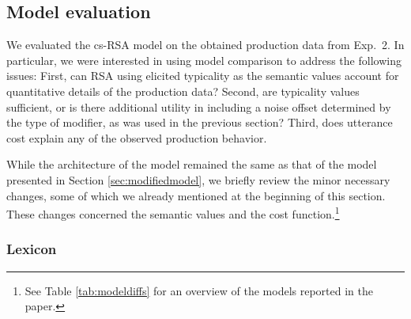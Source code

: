 \documentclass[11pt]{article}
\newcommand{\tableref}[1]{Table \ref{#1}}
\newcommand{\sectionref}[1]{Section \ref{#1}}
\begin{document}
\subsection{Model evaluation}
\label{sec:colorypicalitymodel}


We evaluated the cs-RSA model on the obtained production data from Exp.~2. In particular, we were interested in using model comparison to address the following issues:
First, can RSA using elicited typicality as the semantic values account for quantitative details of the production data?
Second, are typicality values sufficient, or is there additional utility in including a noise offset determined by the type of modifier, as was used in the previous section?
Third, does utterance cost explain any of the observed production behavior. 


While the architecture of the model remained the same as that of the model presented in \sectionref{sec:modifiedmodel}, we briefly review the minor necessary changes, some of which we already mentioned at the beginning of this section. These changes concerned the semantic values and the cost function.\footnote{See \tableref{tab:modeldiffs} for an overview of the models reported in the paper.} 

\subsubsection{Lexicon}
\end{document}
